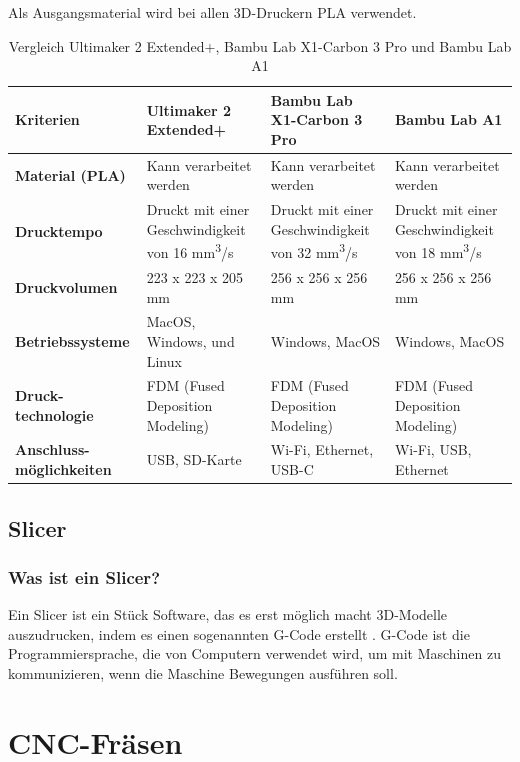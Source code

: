 Als Ausgangsmaterial wird bei allen 3D-Druckern PLA verwendet.
\begin{table} [H]
	\begin{tabular}{ |p{2.7cm} |p{4cm}|p{4cm}|p{4cm}| }
		\hline
		\textbf{Kriterien} & \textbf{Ultimaker 2 Extended+} & \textbf{Bambu Lab X1-Carbon 3 Pro} & \textbf{Bambu Lab A1} \\
		\hline
		\textbf{Material (PLA)} & Kann verarbeitet werden & Kann verarbeitet werden & Kann verarbeitet werden \\
		\hline
		\textbf{Drucktempo} & Druckt mit einer Geschwindigkeit von 16 mm\textsuperscript{3}/s & Druckt mit einer Geschwindigkeit von 32 mm\textsuperscript{3}/s & Druckt mit einer Geschwindigkeit von 18 mm\textsuperscript{3}/s \\
		\hline
		\textbf{Druckvolumen} & 223 x 223 x 205 mm & 256 x 256 x 256 mm & 256 x 256 x 256 mm \\
		\hline
		\textbf{Betriebssysteme} & MacOS, Windows, und Linux & Windows, MacOS & Windows, MacOS \\
		\hline
		\textbf{Druck-technologie} & FDM (Fused Deposition Modeling) & FDM (Fused Deposition Modeling) & FDM (Fused Deposition Modeling) \\
		\hline
		\textbf{Anschluss-möglichkeiten} & USB, SD-Karte & Wi-Fi, Ethernet, USB-C & Wi-Fi, USB, Ethernet \\
		\hline
	\end{tabular}
	\caption{Vergleich Ultimaker 2 Extended+, Bambu Lab X1-Carbon 3 Pro und Bambu Lab A1}
\end{table}



\subsection{Slicer}
\subsubsection{Was ist ein Slicer?}
Ein Slicer ist ein Stück Software, das es erst möglich macht 3D-Modelle auszudrucken, indem es einen sogenannten G-Code erstellt . G-Code ist die Programmiersprache, die von Computern verwendet wird, um mit Maschinen zu kommunizieren, wenn die Maschine Bewegungen ausführen soll. \parencite{SlicerGCode} \\



\section{CNC-Fräsen}

